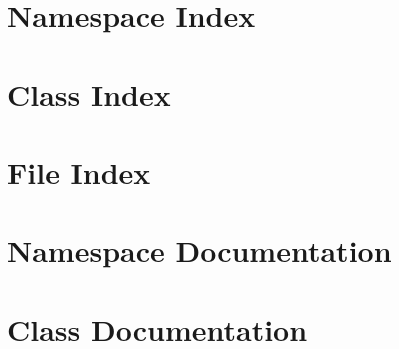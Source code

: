 \documentclass[twoside]{book}
\newcommand{\+}{\discretionary{\mbox{\scriptsize$\hookleftarrow$}}{}{}}
\begin{document}
\chapter{Namespace Index}

\chapter{Class Index}

\chapter{File Index}

\chapter{Namespace Documentation}

\chapter{Class Documentation}


















































\end{document}
